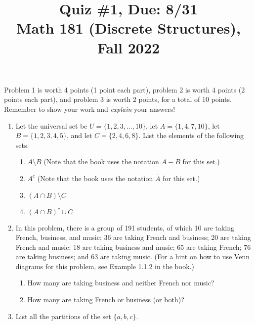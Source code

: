 \documentclass[11pt]{article}
\title{Quiz \#1, Due: 8/31 \\Math 181 (Discrete Structures), Fall 2022}
\date{}
\begin{document}
\maketitle

\thispagestyle{empty}

\vspace{-1cm}

Problem 1 is worth 4 points (1 point each part), problem 2 is worth 4 points (2 points each part), and problem 3 is worth 2 points, for a total of 10 points. Remember to show your work and \emph{explain} your answers!

\begin{enumerate}
\item Let the universal set be $U=\{1,2,3,\ldots,10\}$, let $A=\{1,4,7,10\}$, let $B=\{1,2,3,4,5\}$, and let $C=\{2,4,6,8\}$. List the elements of the following sets.

\begin{enumerate}
\item $A \setminus B$ \hfill (Note that the book uses the notation $A-B$ for this set.)
\item $A^c$ \hfill (Note that the book uses the notation $\overline{A}$ for this set.)
\item $(A\cap B) \setminus C$
\item $(A \cap B)^c \cup C$
\end{enumerate}

\item In this problem, there is a group of 191 students, of which 10 are taking French, business, and music; 36 are taking French and business; 20 are taking French and music; 18 are taking business and music; 65 are taking French; 76 are taking business; and 63 are taking music. (For a hint on how to use Venn diagrams for this problem, see Example 1.1.2 in the book.)

\begin{enumerate}
\item How many are taking business and neither French nor music?
\item How many are taking French or business (or both)?
\end{enumerate}

\item List all the partitions of the set $\{a,b,c\}$.

\end{enumerate}
\end{document}
